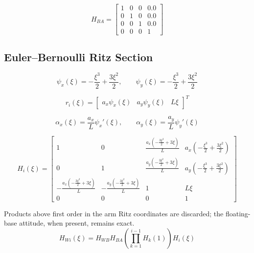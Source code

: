 \documentclass[11pt]{article}
\begin{document}
\begin{equation}
H_{BA}=\begin{bmatrix}1 & 0 & 0 & 0.0\\0 & 1 & 0 & 0.0\\0 & 0 & 1 & 0.0\\0 & 0 & 0 & 1\end{bmatrix}\label{eq:mount-transform}
\end{equation}

\subsection{Euler--Bernoulli Ritz Section}
\begin{equation}
\psi_x(\xi)=- \frac{\xi^{3}}{2} + \frac{3 \xi^{2}}{2},\qquad\psi_y(\xi)=- \frac{\xi^{3}}{2} + \frac{3 \xi^{2}}{2}
\end{equation}

\begin{equation}
r_i(\xi)=\begin{bmatrix}a_x\psi_x(\xi)&a_y\psi_y(\xi)&L\xi\end{bmatrix}^T
\end{equation}

\begin{equation}
\alpha_x(\xi)=\frac{a_x}{L}\psi_x'(\xi),\qquad \alpha_y(\xi)=\frac{a_y}{L}\psi_y'(\xi)
\end{equation}

\begin{equation}
H_i(\xi)=\begin{bmatrix}1 & 0 & \frac{a_x \left(- \frac{3 \xi^{2}}{2} + 3 \xi\right)}{L} & a_x \left(- \frac{\xi^{3}}{2} + \frac{3 \xi^{2}}{2}\right)\\0 & 1 & \frac{a_y \left(- \frac{3 \xi^{2}}{2} + 3 \xi\right)}{L} & a_y \left(- \frac{\xi^{3}}{2} + \frac{3 \xi^{2}}{2}\right)\\- \frac{a_x \left(- \frac{3 \xi^{2}}{2} + 3 \xi\right)}{L} & - \frac{a_y \left(- \frac{3 \xi^{2}}{2} + 3 \xi\right)}{L} & 1 & L \xi\\0 & 0 & 0 & 1\end{bmatrix}\label{eq:local-transform}
\end{equation}

Products above first order in the arm Ritz coordinates are discarded; the floating-base attitude, when present, remains exact.
\begin{equation}
H_{Wi}(\xi)=H_{WB}H_{BA}\left(\prod_{k=1}^{i-1}H_k(1)\right)H_i(\xi)
\end{equation}
\end{document}
